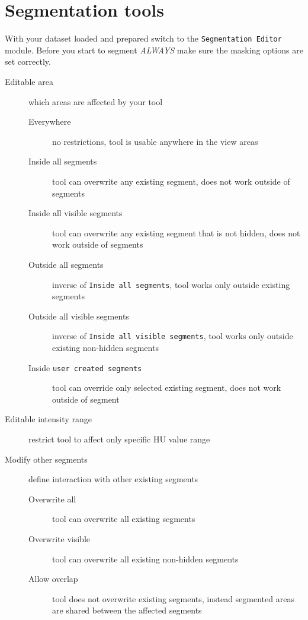 \section{Segmentation tools}
With your dataset loaded and prepared switch to the \texttt{Segmentation Editor} module.
Before you start to segment \emph{ALWAYS} make sure the masking options are set correctly.
\begin{description}
	\item [Editable area] which areas are affected by your tool
	      \begin{description}
		      \item [Everywhere] no restrictions, tool is usable anywhere in the view areas
		      \item [Inside all segments] tool can overwrite any existing segment, does not work outside of segments
		      \item [Inside all visible segments] tool can overwrite any existing segment that is not hidden, does not work outside of segments
		      \item [Outside all segments] inverse of \texttt{Inside all segments}, tool works only outside existing segments
		      \item [Outside all visible segments] inverse of \texttt{Inside all visible segments}, tool works only outside existing non-hidden segments
		      \item [Inside \texttt{user created segments}] tool can override only selected existing segment, does not work outside of segment
	      \end{description}
	\item [Editable intensity range] restrict tool to affect only specific HU value range
	\item [Modify other segments] define interaction with other existing segments
	      \begin{description}
		      \item [Overwrite all] tool can overwrite all existing segments
		      \item [Overwrite visible] tool can overwrite all existing non-hidden segments
		      \item [Allow overlap] tool does not overwrite existing segments, instead segmented areas are shared between the affected segments
	      \end{description}
\end{description}
\pagebreak

